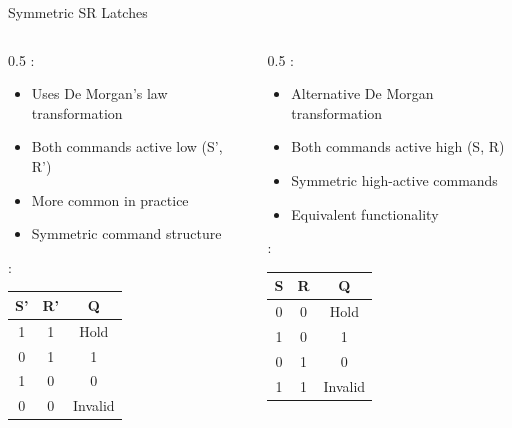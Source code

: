 \begin{frame}{Symmetric SR Latches}
\begin{columns}
\begin{column}{0.5\textwidth}
:
\begin{itemize}
\item Uses De Morgan's law transformation
\item Both commands active low (S', R')
\item More common in practice
\item Symmetric command structure
\end{itemize}

\vspace{0.3cm}
:
\begin{center}
\begin{tabular}{|c|c|c|}
\hline
S' & R' & Q \\
\hline
1 & 1 & Hold \\
0 & 1 & 1 \\
1 & 0 & 0 \\
0 & 0 & Invalid \\
\hline
\end{tabular}
\end{center}
\end{column}
\begin{column}{0.5\textwidth}
:
\begin{itemize}
\item Alternative De Morgan transformation
\item Both commands active high (S, R)
\item Symmetric high-active commands
\item Equivalent functionality
\end{itemize}

\vspace{0.3cm}
:
\begin{center}
\begin{tabular}{|c|c|c|}
\hline
S & R & Q \\
\hline
0 & 0 & Hold \\
1 & 0 & 1 \\
0 & 1 & 0 \\
1 & 1 & Invalid \\
\hline
\end{tabular}
\end{center}
\end{column}
\end{columns}

\vspace{0.3cm}
\begin{center}

\end{center}
\end{frame}

